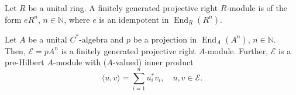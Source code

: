 \documentclass[12pt]{article}
\newcommand*{\Nset}{\mathbb{N}}
\newcommand*{\hilbmod}[1][E]{\mathord{\mathcal{#1}}}
\newcommand*{\End}{\mathop{\mathrm{End}}\nolimits}
\theoremstyle{inlinedefn}
\theoremstyle{break}
\begin{document}
Let $R$ be a unital ring.
A finitely generated projective right $R$-module is of the form $eR^n$,
$n \in \Nset$, where $e$ is an idempotent in $\End_R(R^n)$.

Let $A$ be a unital $C^*$-algebra and $p$ be a projection in $\End_A(A^n)$, $n \in \Nset$.
Then, $\hilbmod = pA^n$ is a finitely generated projective right $A$-module.
Further, $\hilbmod$ is a pre-Hilbert $A$-module with ($A$-valued) inner product
\[
\langle u,v \rangle = \sum_{i=1}^n u_i^* v_i, \quad u,v \in \hilbmod.
\]
\end{document}
